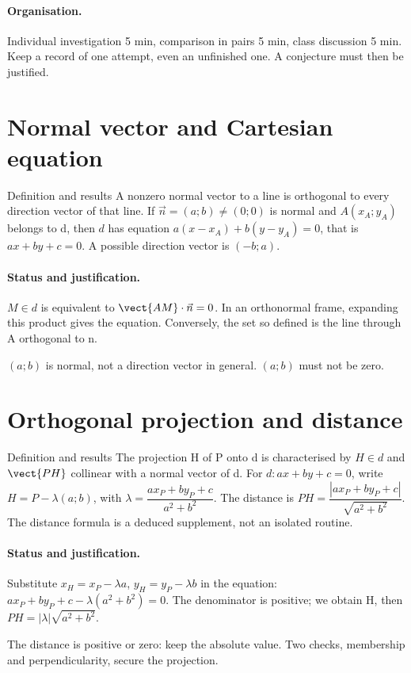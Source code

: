 \paragraph{Organisation.} Individual investigation 5 min, comparison in pairs 5 min, class discussion 5 min. Keep a record of one attempt, even an unfinished one. A conjecture must then be justified.
\section{Normal vector and Cartesian equation}\label{C07-U1}
\begin{repere}{Definition and results}
A nonzero normal vector to a line is orthogonal to every direction vector of that line. If $\vec n=(a;b)\ne(0;0)$ is normal and $A(x_A;y_A)$ belongs to d, then $d$ has equation $a(x-x_A)+b(y-y_A)=0$, that is $ax+by+c=0$. A possible direction vector is $(-b;a)$.
\end{repere}
\paragraph{Status and justification.} $M\in d$ is equivalent to $\vect{AM}\cdot\vec n=0$. In an orthonormal frame, expanding this product gives the equation. Conversely, the set so defined is the line through A orthogonal to n.
\label{C07-EX1}
\begin{erreur}$(a;b)$ is normal, not a direction vector in general. $(a;b)$ must not be zero.\end{erreur}
\label{C07-AP1}
\section{Orthogonal projection and distance}\label{C07-U2}
\begin{repere}{Definition and results}
The projection H of P onto d is characterised by $H\in d$ and $\vect{PH}$ collinear with a normal vector of d. For $d:ax+by+c=0$, write $H=P-\lambda(a;b)$, with $\lambda =\dfrac{ax_P+by_P+c}{a^2+b^2}$. The distance is $PH=\dfrac{|ax_P+by_P+c|}{\sqrt {a^2+b^2}}$. The distance formula is a deduced supplement, not an isolated routine.
\end{repere}
\paragraph{Status and justification.} Substitute $x_H=x_P-\lambda a$, $y_H=y_P-\lambda b$ in the equation: $ax_P+by_P+c-\lambda(a^2+b^2)=0$. The denominator is positive; we obtain H, then $PH=|\lambda|\sqrt{a^2+b^2}$.
\label{C07-EX2}

\begin{erreur}The distance is positive or zero: keep the absolute value. Two checks, membership and perpendicularity, secure the projection.\end{erreur}
\label{C07-AP2}
